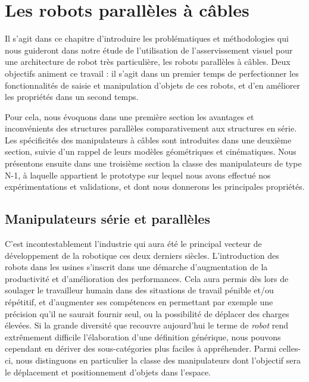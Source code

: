 \chapter{Les robots parall\`eles \`a c\^ables} \label{chap0}

Il s'agit dans ce chapitre d'introduire les problématiques et méthodologies qui 
nous guideront dans notre étude de l'utilisation de l'asservissement visuel pour 
une architecture de robot très particulière, les robots parall\`eles \`a 
c\^ables. Deux objectifs animent ce travail : il s'agit dans un premier temps 
de perfectionner les fonctionnalités de saisie et manipulation d'objets de ces 
robots, et d'en améliorer les propriétés dans un second temps.

Pour cela, nous  évoquons dans une première section les avantages et 
inconvénients des structures parallèles comparativement aux structures en série. 
Les spécificités des manipulateurs à c\^ables sont introduites dans une deuxième 
section, suivie d'un rappel de leurs modèles géométriques et cinématiques. 
Nous présentons ensuite dans une troisième section la classe des manipulateurs 
de type N-1, \`a laquelle appartient le prototype sur lequel nous avons 
effectu\'e nos expérimentations et validations, et dont nous donnerons 
les principales propri\'et\'es.


\section{Manipulateurs série et parallèles} \label{chap0-0}

C'est incontestablement l'industrie qui aura été le principal vecteur de 
développe\-ment de la robotique ces deux derniers siècles. L'introduction des 
robots dans les usines s'inscrit dans une démarche d'augmentation de la 
productivité et d'amélio\-ration des performances. Cela aura permis dès lors de 
soulager le travailleur humain dans des situations de travail pénible et/ou 
répétitif, et d'augmenter ses compétences en permettant par exemple une 
précision qu'il ne saurait fournir seul, ou la possibilité de déplacer des 
charges élevées. Si la grande diversité que recouvre aujourd'hui le terme de 
{\it robot} rend extrêmement difficile l'élaboration d'une définition générique, 
nous pouvons cependant en dériver des sous-catégories plus faciles à 
appréhender. Parmi celles-ci, nous distinguons en particulier la classe des 
manipulateurs dont l'objectif sera le déplacement et positionnement d'objets 
dans l'espace.

